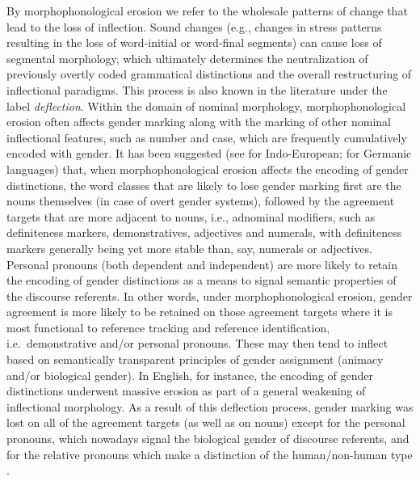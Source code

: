 \documentclass[output=collectionpaper]{langsci/langscibook}
\begin{document}
By morphophonological erosion we refer to the wholesale patterns of change that lead to the loss of inflection. Sound changes (e.g., changes in stress patterns resulting in the loss of word-initial or word-final segments) can cause loss of segmental morphology, which ultimately determines the neutralization of previously overtly coded grammatical distinctions and the overall restructuring of inflectional paradigms. This process is also known in the literature under the label \textit{deflection}. Within the domain of nominal morphology, morphophonological erosion often affects gender marking along with the marking of other nominal inflectional features, such as number and case, which are frequently cumulatively encoded with gender. It has been suggested (see \citealt{Priestly1983} for Indo-European; \citealt{Audring2009} for Germanic languages) that, when morphophonological erosion affects the encoding of gender distinctions, the word classes that are likely to lose gender marking first are the nouns themselves (in case of overt gender systems), followed by the agreement targets that are more adjacent to nouns, i.e., adnominal modifiers, such as definiteness markers, demonstratives, adjectives and numerals, with definiteness markers generally being yet more stable than, say, numerals or adjectives. Personal pronouns (both dependent and independent) are more likely to retain the encoding of gender distinctions as a means to signal semantic properties of the discourse referents. In other words, under morphophonological erosion, gender agreement is more likely to be retained on those agreement targets where it is most functional to reference tracking and reference identification, i.e.\ demonstrative and/or personal pronouns. These may then tend to inflect based on semantically transparent principles of gender assignment (animacy and/or biological gender). In English, for instance, the encoding of gender distinctions underwent massive erosion as part of a general weakening of inflectional morphology. As a result of this deflection process, gender marking was lost on all of the agreement targets (as well as on nouns) except for the personal pronouns, which nowadays signal the biological gender of discourse referents, and for the relative pronouns which make a distinction of the human/non-human type \citep{Curzan2003}.
\end{document}
